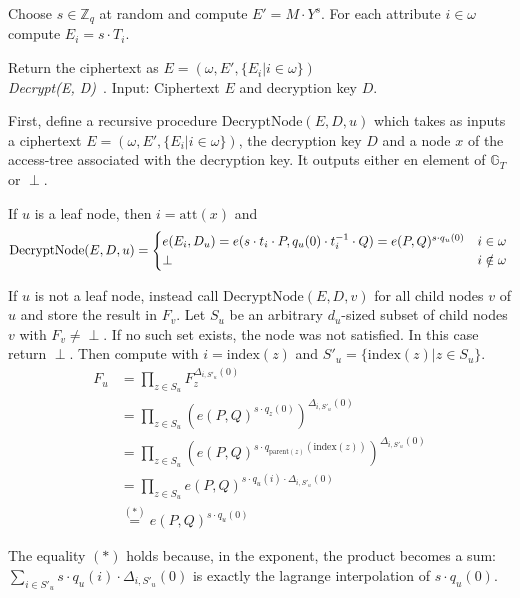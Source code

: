 Choose $s \in \mathbb{Z}_q$ at random and compute $E' = M \cdot Y^s$.
For each attribute $i \in \omega$ compute $E_i = s \cdot T_i$.

Return the ciphertext as $E = (\omega, E', \{E_i | i \in \omega\})$
\\

\emph{Decrypt(E, D)}~\cite{goyal_attribute-based_2006}.
Input: Ciphertext $E$ and decryption key $D$.

First, define a recursive procedure $\text{DecryptNode}(E, D, u)$ which takes as inputs a ciphertext $E = (\omega, E', \{E_i | i \in \omega\})$, the decryption key $D$ and a node $x$ of the \gls{access-tree} associated with the decryption key.
It outputs either en element of $\mathbb{G}_T$ or $\perp$.

If $u$ is a leaf node, then $i = \text{att}(x)$ and 
\begin{equation}
    \text{DecryptNode}(E, D, u) = \begin{cases}
        e(E_i, D_u) = e(s \cdot t_i \cdot P, q_u(0) \cdot t_i^{-1} \cdot Q) = e(P, Q)^{s\cdot q_u(0)} & i \in \omega\\
        \perp & i \notin \omega
    \end{cases}\\
\end{equation}

If $u$ is not a leaf node, instead call $\text{DecryptNode}(E, D, v)$ for all child nodes $v$ of $u$ and store the result in $F_v$.
Let $S_u$ be an arbitrary $d_u$-sized subset of child nodes $v$ with $F_v \neq \perp$. If no such set exists, the node was not satisfied. In this case return $\perp$.
Then compute with $i = \text{index}(z)$ and $S'_u = \{\text{index}(z) | z \in S_u\}$.
\begin{equation}
    \begin{split}
        F_u &= \prod_{z \in S_u} F_z^{\Delta_{i,S'_u}(0)}\\
        &= \prod_{z \in S_u} (e(P,Q)^{s\cdot q_z(0)})^{\Delta_{i,S'_u}(0)}\\
        &= \prod_{z \in S_u} (e(P,Q)^{s\cdot q_{\text{parent}(z)}(\text{index}(z))})^{\Delta_{i,S'_u}(0)}\\
        &= \prod_{z \in S_u} e(P,Q)^{s\cdot q_u(i) \cdot \Delta_{i,S'_u}(0)}\\
        &\stackrel{(*)}{=} e(P,Q)^{s \cdot q_u(0)}
    \end{split}
\end{equation}

The equality $(*)$ holds because, in the exponent, the product becomes a sum: $\sum_{i\in S'_u} s \cdot q_u(i) \cdot \Delta_{i,S'_u}(0)$ is exactly the lagrange interpolation of $s \cdot q_u(0)$.


